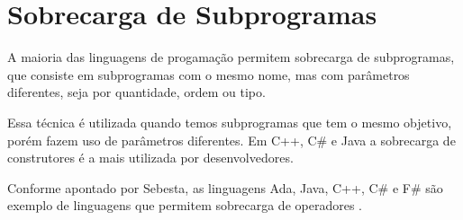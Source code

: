 \section{Sobrecarga de Subprogramas} %
\label{sec:sobrecarga_de_subprogramas}
A maioria das linguagens de progamação permitem sobrecarga de subprogramas, que consiste em subprogramas com o mesmo nome, mas com parâmetros diferentes, seja por quantidade, ordem ou tipo.

Essa técnica é utilizada quando temos subprogramas que tem o mesmo objetivo, porém fazem uso de parâmetros diferentes. Em C++, C\# e Java a sobrecarga de construtores é a mais utilizada por desenvolvedores.

Conforme apontado por Sebesta, as linguagens Ada, Java, C++, C\# e F\# são exemplo de linguagens que permitem sobrecarga de operadores \cite{sebesta}.
